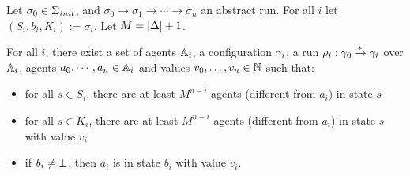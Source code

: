%	
%	
%	
%	
%	
%	


\begin{lemma}
	\label{lem:correctness-construction}
	
	Let $\sigma_0 \in \aconfiginitset$, and $\sigma_0 \to \sigma_1 \to \cdots \to \sigma_n$ an abstract run. For all $i$ let $(S_i, b_i, K_i) := \sigma_i$. Let $M = |\Delta|+1$.
	
	For all $i$, there exist a set of agents $\mathbb{A}_i$, a configuration $\gamma_i$, a run $\rho_i : \gamma_0 \xrightarrow{*} \gamma_i$ over $\mathbb{A}_i$, agents $a_0, \cdots, a_n \in \mathbb{A}_i$ and values $v_0, \ldots, v_n \in \mathbb{N}$ such that:
	\begin{itemize}
		\item for all $s \in S_i$, there are at least $M^{n-i}$ agents (different from $a_i$) in state $s$ 
		
		\item for all $s \in K_i$, there are at least $M^{n-i}$ agents (different from $a_i$) in state $s$ with value $v_i$
		
		\item if $b_i \neq \bot$, then $a_i$ is in state $b_i$ with value $v_i$.
	\end{itemize}
\end{lemma}

